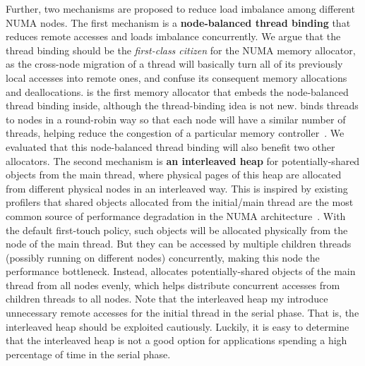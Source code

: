 Further, two mechanisms are proposed to reduce load imbalance among different NUMA nodes. The first mechanism is a \textbf{node-balanced thread binding} that reduces remote accesses and loads imbalance concurrently. We argue that the thread binding should be the \textit{first-class citizen} for the NUMA memory allocator, as the cross-node migration of a thread will basically turn all of its previously local accesses into remote ones, and confuse its consequent memory allocations and deallocations. \NM{} is the first memory allocator that embeds the node-balanced thread binding inside, although the thread-binding idea is not new. \NM{} binds threads to nodes in a round-robin way so that each node will have a similar number of threads, helping reduce the congestion of a particular memory controller~\cite{Blagodurov:2011:CNC:2002181.2002182}. We evaluated that this node-balanced thread binding will also benefit two other allocators.  The second mechanism is \textbf{an interleaved heap} for potentially-shared objects from the main thread, where physical pages of this heap are allocated from different physical nodes in an interleaved way. This is inspired by existing profilers that shared objects allocated from the initial/main thread are the most common source of performance degradation in the NUMA architecture~\cite{XULIU, MemProf}. With the default first-touch policy, such objects will be allocated physically from the node of the main thread. But they can be accessed by multiple children threads (possibly running on different nodes) concurrently, making this node the performance bottleneck. Instead, \NM{} allocates potentially-shared objects of the main thread  from all nodes evenly,  which helps distribute concurrent accesses from children threads to all nodes. Note that the interleaved heap my introduce unnecessary remote accesses for the initial thread in the serial phase. That is, the interleaved heap should be exploited cautiously. Luckily, it is easy to determine that the interleaved heap is not a good option for applications spending a high percentage of time in the serial phase.    

 
